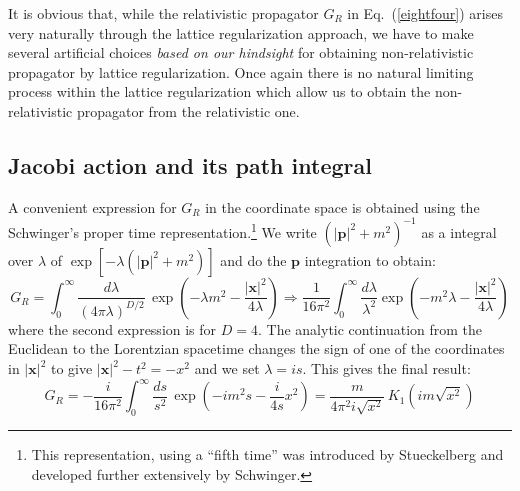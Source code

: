 \documentclass{article}
\def\eq#1{{Eq.~(\ref{#1})}}
\begin{document}
It is obvious that, while the relativistic propagator $G_R$ in \eq{eightfour} arises very naturally through the lattice regularization approach, we have to  make several artificial choices \textit{based on our hindsight} for obtaining non-relativistic propagator by lattice regularization. Once again there is no natural limiting process within the lattice regularization which allow us to obtain the non-relativistic propagator from the relativistic one. 

\subsection{Jacobi action and its path integral}\label{sec:jacobi}

A convenient expression for $G_R$ in the coordinate space is obtained using the Schwinger's proper time representation.\footnote{This representation, using a ``fifth time'' was introduced by Stueckelberg \cite{E1,E2} and developed further extensively by Schwinger.} 
 We write $(|{\bm p}|^2+m^2)^{-1}$ as a integral over $\lambda$ of $\exp[-\lambda(|{\bm p}|^2+m^2)]$ and do the $\bm{p}$ integration to obtain:
\begin{equation}
G_R = \int_0^\infty \frac{d\lambda}{(4\pi\lambda)^{D/2}}\, \exp\left({-\lambda m^2-\frac{|\mathbf{x}|^2}{4\lambda}}\right)
\Rightarrow\frac{1}{16\pi^2} \int_0^\infty\frac{d\lambda}{\lambda^2} \exp \left({-m^2\lambda-\frac{|\mathbf{x}|^2}{4\lambda}}\right)
\end{equation}
where the second expression is for 
$D=4$.
The analytic continuation from the Euclidean to the Lorentzian spacetime changes the sign of one of the coordinates in $|{\mathbf x}|^2$ to give $|{\bm x}|^2-t^2=-x^2$ and we set $\lambda = i s$. This gives the final result:
\begin{equation}
G_R 
=-\frac{i}{16\pi^2}\int_0^\infty\frac{ds}{s^2}\, \exp\left({-im^2 s- \frac{i}{4s}x^2}\right)=\frac{m}{4\pi^2 i \sqrt{x^2}} \, K_1(im\sqrt{x^2})
\label{macd}
\end{equation} 
\end{document}
